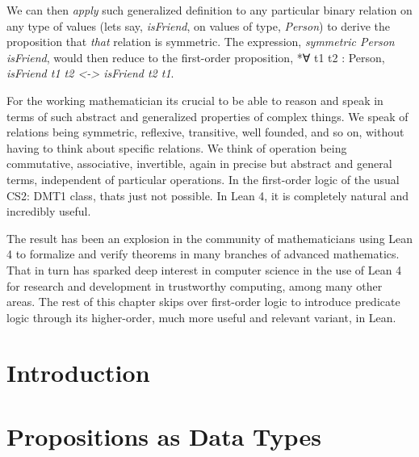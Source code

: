 \documentclass{book}
\begin{document}
We can then \emph{apply} such generalized definition to any particular binary relation on any type of values (let\textquotesingle s say, \emph{isFriend}, on values of type, \emph{Person}) to derive the proposition that \emph{that} relation is symmetric. The expression, \emph{symmetric Person isFriend}, would then reduce to the first-order proposition, *∀ t1 t2 : Person, \emph{isFriend t1 t2 \textless{}-\textgreater{}  isFriend t2 t1}.

For the working mathematician it\textquotesingle s crucial to be able to reason and speak in terms of such abstract and generalized properties of complex things. We speak of relations being symmetric, reflexive, transitive, well founded, and so on, without having to think about specific relations. We think of operation being commutative, associative, invertible, again in precise but abstract and general terms, independent of particular operations. In the first-order logic of the usual CS2: DMT1 class, that\textquotesingle s just not possible. In Lean 4, it is completely natural and incredibly useful.

The result has been an explosion in the community of mathematicians using Lean 4 to formalize and verify theorems in many branches of advanced mathematics. That in turn has sparked deep interest in computer science in the use of Lean 4 for research and development in trustworthy computing, among many other areas. The rest of this chapter skips over first-order logic to introduce predicate logic through its higher-order, much more useful and relevant variant, in Lean.

\hypertarget{pandoc.profile.debug__pandoc__debug__src__dmt1__lectures__l07_predicatelogic__00_introduction.lean.md}{}
\hypertarget{pandoc.profile.debug__pandoc__debug__src__dmt1__lectures__l07_predicatelogic__00_introduction.lean.md__introduction}{%
\section{Introduction}\label{pandoc.profile.debug__pandoc__debug__src__dmt1__lectures__l07_predicatelogic__00_introduction.lean.md__introduction}}

\hypertarget{pandoc.profile.debug__pandoc__debug__src__dmt1__lectures__l07_predicatelogic__01_propsascomptypes.lean.md}{}
\hypertarget{pandoc.profile.debug__pandoc__debug__src__dmt1__lectures__l07_predicatelogic__01_propsascomptypes.lean.md__propositions-as-data-types}{%
\section{Propositions as Data Types}\label{pandoc.profile.debug__pandoc__debug__src__dmt1__lectures__l07_predicatelogic__01_propsascomptypes.lean.md__propositions-as-data-types}}
\end{document}
